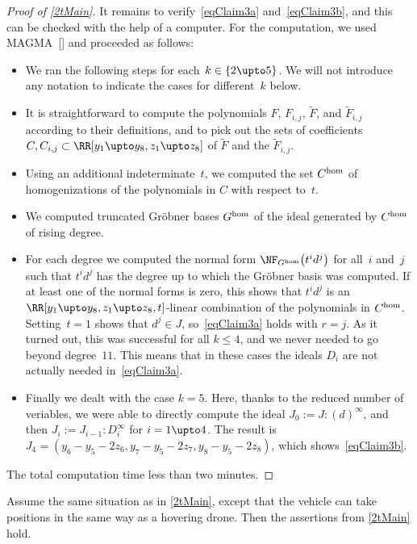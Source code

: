 \documentclass[reqno]{amsart}
\begin{document}
\begin{proof}[Proof of \cref{2tMain}]
  It remains to verify~\cref{eqClaim3a} and~\eqref{eqClaim3b}, and this
  can be checked with the help of a computer. For the computation, we
  used MAGMA~[] and proceeded as
  follows: %
  \begin{itemize}
  \item We ran the following steps for each~$k \in \{2 \upto 5\}$. We
    will not introduce any notation to indicate the cases for
    different~$k$ below.
  \item It is straightforward to compute the polynomials $F$,
    $F_{i,j}$, $\tilde{F}$, and $\tilde{F}_{i,j}$ according to their
    definitions, and to pick out the sets of coefficients
    $C,C_{i,j} \subset \RR[y_1 \upto y_8,z_1 \upto z_8]$ of
    $\tilde{F}$ and the $\tilde{F}_{i,j}$.
  \item Using an additional indeterminate~$t$, we computed the set
    $C^{\operatorname{hom}}$ of homogenizations of the polynomials in $C$ with respect
    to~$t$.
  \item We computed truncated Gr\"obner bases $G^{\operatorname{hom}}$ of the ideal
    generated by $C^{\operatorname{hom}}$ of rising degree.
  \item For each degree we computed the normal form
    $\NF_{G^\h}\bigl(t^i d^j\bigr)$ for all~$i$ and~$j$ such that
    $t^i d^j$ has the degree up to which the Gr\"obner basis was
    computed. If at least one of the normal forms is zero, this shows
    that $t^i d^j$ is an $\RR[y_1 \upto y_8,z_1 \upto z_8,t]$-linear
    combination of the polynomials in $C^{\operatorname{hom}}$. Setting~$t = 1$ shows
    that $d^j \in J$, so~\cref{eqClaim3a} holds with $r = j$. As it
    turned out, this was successful for all $k \le 4$, and we never
    needed to go beyond degree~$11$. This means that in these cases
    the ideals $D_i$ are not actually needed in~\cref{eqClaim3a}.
  \item Finally we dealt with the case $k = 5$. Here, thanks to the
    reduced number of veriables, we were able to directly compute the
    ideal $J_0 := J:(d)^\infty$, and then $J_i := J_{i-1}:D_i^\infty$
    for $i = 1 \upto 4$. The result is
    $J_4 = (y_6 - y_5 - 2 z_6,y_7 - y_5 - 2 z_7,y_8 - y_5 - 2 z_8)$,
    which shows~\eqref{eqClaim3b}.
  \end{itemize}
  The total computation time less than two minutes.
\end{proof}

\begin{theorem} \label{2tHovering}%
  Assume the same situation as in \cref{2tMain}, except that the
  vehicle can take positions in the same way as a hovering drone. Then
  the assertions from \cref{2tMain} hold.
\end{theorem}
\end{document}
